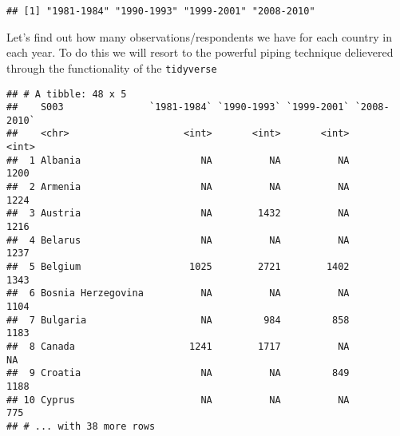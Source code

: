 \documentclass[]{article}
\newenvironment{Shaded}{\begin{snugshade}}{\end{snugshade}}
\newcommand{\KeywordTok}[1]{\textcolor[rgb]{0.13,0.29,0.53}{\textbf{#1}}}
\newcommand{\DataTypeTok}[1]{\textcolor[rgb]{0.13,0.29,0.53}{#1}}
\newcommand{\StringTok}[1]{\textcolor[rgb]{0.31,0.60,0.02}{#1}}
\newcommand{\OperatorTok}[1]{\textcolor[rgb]{0.81,0.36,0.00}{\textbf{#1}}}
\newcommand{\NormalTok}[1]{#1}
\begin{document}
\begin{Shaded}
\end{Shaded}

\begin{verbatim}
## [1] "1981-1984" "1990-1993" "1999-2001" "2008-2010"
\end{verbatim}

Let's find out how many observations/respondents we have for each
country in each year. To do this we will resort to the powerful piping
technique delievered through the functionality of the \texttt{tidyverse}

\begin{Shaded}
\end{Shaded}

\begin{verbatim}
## # A tibble: 48 x 5
##    S003               `1981-1984` `1990-1993` `1999-2001` `2008-2010`
##    <chr>                    <int>       <int>       <int>       <int>
##  1 Albania                     NA          NA          NA        1200
##  2 Armenia                     NA          NA          NA        1224
##  3 Austria                     NA        1432          NA        1216
##  4 Belarus                     NA          NA          NA        1237
##  5 Belgium                   1025        2721        1402        1343
##  6 Bosnia Herzegovina          NA          NA          NA        1104
##  7 Bulgaria                    NA         984         858        1183
##  8 Canada                    1241        1717          NA          NA
##  9 Croatia                     NA          NA         849        1188
## 10 Cyprus                      NA          NA          NA         775
## # ... with 38 more rows
\end{verbatim}
\end{document}
